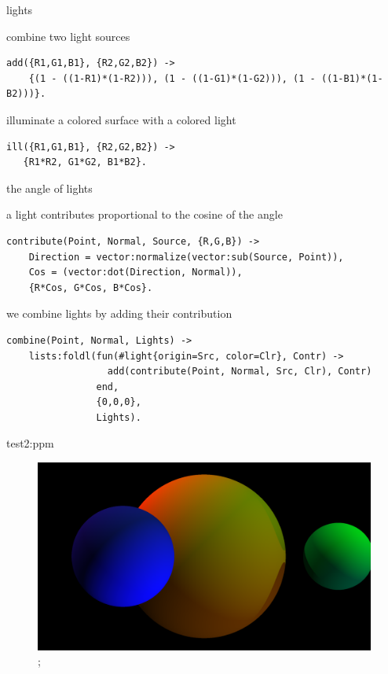 \begin{frame}[fragile]{lights}

\pause 
combine two light sources

\pause 
\begin{verbatim}
add({R1,G1,B1}, {R2,G2,B2}) ->
    {(1 - ((1-R1)*(1-R2))), (1 - ((1-G1)*(1-G2))), (1 - ((1-B1)*(1-B2)))}.
\end{verbatim}

\pause 
\vspace{20pt}
illuminate a colored surface with a colored light

\begin{verbatim}
ill({R1,G1,B1}, {R2,G2,B2}) ->
   {R1*R2, G1*G2, B1*B2}.
\end{verbatim}

\end{frame}

\begin{frame}[fragile]{the angle of lights}

\pause 
a light contributes proportional to the cosine of the angle 
\pause 

\begin{verbatim}
contribute(Point, Normal, Source, {R,G,B}) ->
    Direction = vector:normalize(vector:sub(Source, Point)),
    Cos = (vector:dot(Direction, Normal)),
    {R*Cos, G*Cos, B*Cos}.
\end{verbatim}

\pause 
\vspace{20pt} we combine lights by adding their contribution

\begin{verbatim}
combine(Point, Normal, Lights) ->
    lists:foldl(fun(#light{origin=Src, color=Clr}, Contr) -> 
                  add(contribute(Point, Normal, Src, Clr), Contr)
                end,  
                {0,0,0},
                Lights).
\end{verbatim}

\end{frame}

\begin{frame}{test2:ppm}

\begin{figure}
\includegraphics[scale=0.2]{test2.png};
\end{figure}

\end{frame}



